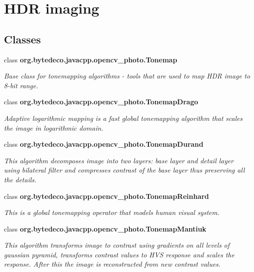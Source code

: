 \hypertarget{group__photo__hdr}{}\section{H\+DR imaging}
\label{group__photo__hdr}
\subsection*{Classes}
\begin{DoxyCompactItemize}
\item 
class {\bfseries org.\+bytedeco.\+javacpp.\+opencv\+\_\+photo.\+Tonemap}
\begin{DoxyCompactList}\small\item\em Base class for tonemapping algorithms -\/ tools that are used to map H\+DR image to 8-\/bit range. \end{DoxyCompactList}\item 
class {\bfseries org.\+bytedeco.\+javacpp.\+opencv\+\_\+photo.\+Tonemap\+Drago}
\begin{DoxyCompactList}\small\item\em Adaptive logarithmic mapping is a fast global tonemapping algorithm that scales the image in logarithmic domain. \end{DoxyCompactList}\item 
class {\bfseries org.\+bytedeco.\+javacpp.\+opencv\+\_\+photo.\+Tonemap\+Durand}
\begin{DoxyCompactList}\small\item\em This algorithm decomposes image into two layers\+: base layer and detail layer using bilateral filter and compresses contrast of the base layer thus preserving all the details. \end{DoxyCompactList}\item 
class {\bfseries org.\+bytedeco.\+javacpp.\+opencv\+\_\+photo.\+Tonemap\+Reinhard}
\begin{DoxyCompactList}\small\item\em This is a global tonemapping operator that models human visual system. \end{DoxyCompactList}\item 
class {\bfseries org.\+bytedeco.\+javacpp.\+opencv\+\_\+photo.\+Tonemap\+Mantiuk}
\begin{DoxyCompactList}\small\item\em This algorithm transforms image to contrast using gradients on all levels of gaussian pyramid, transforms contrast values to H\+VS response and scales the response. After this the image is reconstructed from new contrast values. \end{DoxyCompactList}\item 

\end{DoxyCompactItemize}
